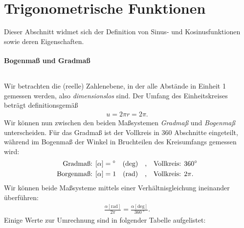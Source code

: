 \section{Trigonometrische Funktionen} 

Dieser Abschnitt widmet sich der Definition von Sinus- und Kosinusfunktionen sowie deren Eigenschaften. 

\paragraph{Bogenmaß und Gradmaß}$~$

\begin{wrapfigure}{r}{7cm}
    \centering
    \vspace{-1cm}
    \vspace{-3mm}
\end{wrapfigure}

Wir betrachten die (reelle) Zahlenebene, in der alle Abstände in Einheit 1 gemessen werden, also \emph{dimensionslos} sind. Der Umfang des Einheitskreises beträgt definitionsgemäß 
\begin{align}
    u = 2\pi r = 2\pi.
\end{align}
Wir können nun zwischen den beiden Maßsystemen \emph{Gradmaß} und \emph{Bogenmaß} unterscheiden. Für das Gradmaß ist der Vollkreis in 360 Abschnitte eingeteilt, während im Bogenmaß der Winkel in Bruchteilen des Kreisumfangs gemessen wird:
\begin{align}
    \begin{split}
        \text{Gradmaß: } [\alpha] &= \si{\degree} \quad(\text{deg}) \qq{,} \text{Vollkreis: } \SI{360}{\degree}\\
        \text{Borgenmaß: } [\alpha] &= 1 \quad(\text{rad}) \qq{,} \text{Vollkreis: } 2\pi.
    \end{split}
\end{align}
Wir können beide Maßsysteme mittels einer Verhältnisgleichung ineinander überführen: 
\begin{align}
    \frac{\alpha [\text{rad}]}{2\pi} = \frac{\alpha [\text{deg}]}{\SI{360}{\degree}}.
\end{align}
Einige Werte zur Umrechnung sind in folgender Tabelle aufgelistet:

